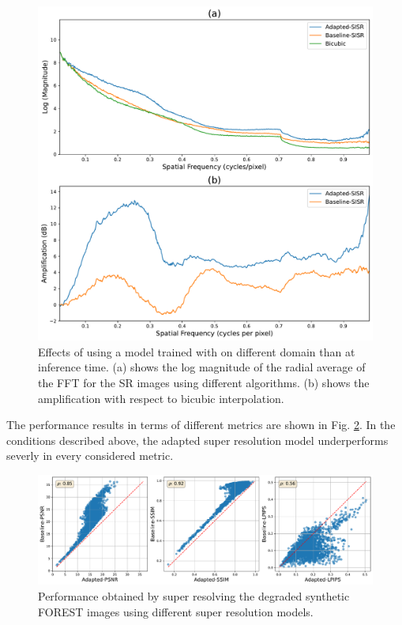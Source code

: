         \begin{figure}[H]
            \centering
            \includegraphics[scale=0.4]{Includes/5-target-prediction-with-domain-gap-fft.pdf}
            \caption{Effects of using a model trained with on different domain than at inference time. 
                     (a) shows the log magnitude of the radial average of the FFT for the SR images using different algorithms.
                     (b) shows the amplification with respect to bicubic interpolation.
                     }
            \label{fig:5-target-prediction-with-domain-gap-fft}
        \end{figure}


        The performance results in terms of different metrics are shown in Fig. \ref{fig:5-target-prediction-with-domain-gap-dataset}. 
        In the conditions described above, the adapted super resolution model underperforms severly in every considered metric.


        \begin{figure}[H]
            \centering
            \includegraphics[scale=0.38]{Includes/5-target-prediction-with-domain-gap-dataset.pdf}
            \caption{Performance obtained by super resolving the degraded synthetic FOREST images using different super resolution models.}
            \label{fig:5-target-prediction-with-domain-gap-dataset}
        \end{figure}
        
